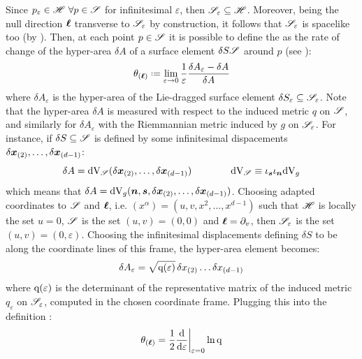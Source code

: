 Since $ p_\varepsilon \in \mathscr{H} \,\,\forall p \in \mathscr{S} $ for infinitesimal $ \varepsilon $, then $ \mathscr{S}_\varepsilon \subseteq \mathscr{H} $. Moreover, being the null direction $ \boldsymbol{\ell} $ transverse to $ \mathscr{S}_\varepsilon $ by construction, it follows that $ \mathscr{S}_\varepsilon $ is spacelike too (by ). Then, at each point $ p \in \mathscr{S} $ it is possible to define the  as the rate of change of the hyper-area $ \delta A $ of a surface element $ \delta S \mathscr{S} $ around $ p $ (see ):
\begin{equation}
  \theta_{(\nn)} \defeq \lim_{\varepsilon \ra 0} \frac{1}{\varepsilon} \frac{\delta A_\varepsilon - \delta A}{\delta A}
  \label{eq:expansion-def}
\end{equation}
where $ \delta A_\varepsilon $ is the hyper-area of the Lie-dragged surface element $ \delta S_\varepsilon \subseteq \mathscr{S}_\varepsilon $. Note that the hyper-area $ \delta A $ is measured with respect to the induced metric $ q $ on $ \mathscr{S} $, and similarly for $ \delta A_\varepsilon $ with the Riemmannian metric induced by $ g $ on $ \mathscr{S}_\varepsilon $. For instance, if $ \delta S \subseteq \mathscr{S} $ is defined by some infinitesimal dispacements $ \delta \boldsymbol{x}_{(2)} , \dots , \delta \boldsymbol{x}_{(d-1)} $:
\begin{equation*}
  \delta A = \mathrm{d} \mathrm{V}_\mathscr{S}(\delta \boldsymbol{x}_{(2)} , \dots , \delta \boldsymbol{x}_{(d-1)})
  \qquad \qquad
  \mathrm{d} \mathrm{V}_\mathscr{S} \equiv \iota_{\boldsymbol{s}} \iota_{\boldsymbol{n}} \mathrm{d} \mathrm{V}_g
\end{equation*}
which means that $ \delta A = \mathrm{d} \mathrm{V}_g (\boldsymbol{n} , \boldsymbol{s} , \delta \boldsymbol{x}_{(2)} , \dots , \delta \boldsymbol{x}_{(d-1)}) $. Choosing adapted coordinates to $ \mathscr{S} $ and $ \boldsymbol{\ell} $, i.e. $ (x^\alpha) = (u , v , x^2 , \dots , x^{d-1}) $ such that $ \mathscr{H} $ is locally the set $ u = 0 $, $ \mathscr{S} $ is the set $ (u , v) = (0,0) $ and $ \boldsymbol{\ell} = \partial_v $, then $ \mathscr{S}_\varepsilon $ is the set $ (u,v) = (0,\varepsilon) $. Choosing the infinitesimal displacements defining $ \delta S $ to be along the coordinate lines of this frame, the hyper-area element becomes:
\begin{equation}
  \delta A_\varepsilon = \sqrt{\mathrm{q}(\varepsilon)} \, \delta x_{(2)} \dots \delta x_{(d-1)}
  \label{eq:delta-A-e}
\end{equation}
where $ \mathrm{q}(\varepsilon) $ is the determinant of the representative matrix of the induced metric $ q_\varepsilon $ on $ \mathscr{S}_\varepsilon $, computed in the chosen coordinate frame. Plugging this into the definition :
\begin{equation*}
  \theta_{(\boldsymbol{\ell})} = \frac{1}{2} \frac{\mathrm{d}}{\mathrm{d} \varepsilon} \bigg\vert_{\varepsilon = 0} \ln \mathrm{q}
\end{equation*}
